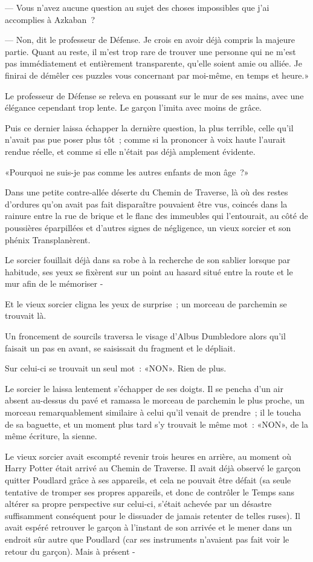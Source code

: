 --- Vous n'avez aucune question au sujet des choses impossibles que j'ai accomplies à Azkaban~?

--- Non, dit le professeur de Défense. Je crois en avoir déjà compris la majeure partie. Quant au reste, il m'est trop rare de trouver une personne qui ne m'est pas immédiatement et entièrement transparente, qu'elle soient amie ou alliée. Je finirai de démêler ces puzzles vous concernant par moi-même, en temps et heure.»

Le professeur de Défense se releva en poussant sur le mur de ses mains, avec une élégance cependant trop lente. Le garçon l'imita avec moins de grâce.

Puis ce dernier laissa échapper la dernière question, la plus terrible, celle qu'il n'avait pas pue poser plus tôt~; comme si la prononcer à voix haute l'aurait rendue réelle, et comme si elle n'était pas déjà amplement évidente.

«Pourquoi ne suis-je pas comme les autres enfants de mon âge~?»

\later

Dans une petite contre-allée déserte du Chemin de Traverse, là où des restes d'ordures qu'on avait pas fait disparaître pouvaient être vus, coincés dans la rainure entre la rue de brique et le flanc des immeubles qui l'entourait, au côté de poussières éparpillées et d'autres signes de négligence, un vieux sorcier et son phénix Transplanèrent.

Le sorcier fouillait déjà dans sa robe à la recherche de son sablier lorsque par habitude, ses yeux se fixèrent sur un point au hasard situé entre la route et le mur afin de le mémoriser -

Et le vieux sorcier cligna les yeux de surprise~; un morceau de parchemin se trouvait là.

Un froncement de sourcils traversa le visage d'Albus Dumbledore alors qu'il faisait un pas en avant, se saisissait du fragment et le dépliait.

Sur celui-ci se trouvait un seul mot~: «NON». Rien de plus.

Le sorcier le laissa lentement s'échapper de ses doigts. Il se pencha d'un air absent au-dessus du pavé et ramassa le morceau de parchemin le plus proche, un morceau remarquablement similaire à celui qu'il venait de prendre~; il le toucha de sa baguette, et un moment plus tard s'y trouvait le même mot~: «NON», de la même écriture, la sienne.

Le vieux sorcier avait escompté revenir trois heures en arrière, au moment où Harry Potter était arrivé au Chemin de Traverse. Il avait déjà observé le garçon quitter Poudlard grâce à ses appareils, et cela ne pouvait être défait (sa seule tentative de tromper ses propres appareils, et donc de contrôler le Temps sans altérer sa propre perspective sur celui-ci, s'était achevée par un désastre suffisamment conséquent pour le dissuader de jamais retenter de telles ruses). Il avait espéré retrouver le garçon à l'instant de son arrivée et le mener dans un endroit sûr autre que Poudlard (car ses instruments n'avaient pas fait voir le retour du garçon). Mais à présent -

